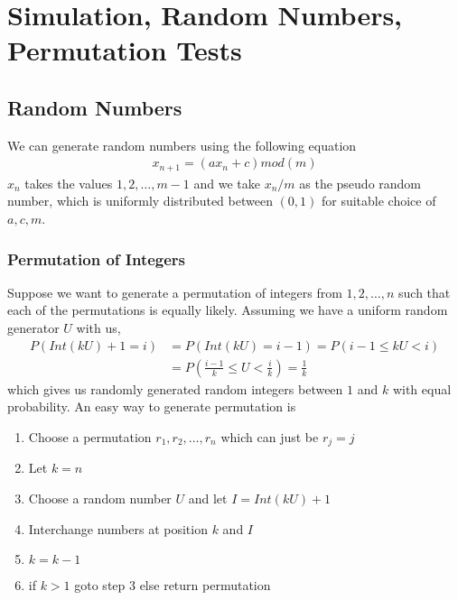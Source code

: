 \documentclass[../probability-notes.tex]{subfiles}
\begin{document}
    \section{Simulation, Random Numbers, Permutation Tests}
    \subsection{Random Numbers}
    We can generate random numbers using the following equation
    \begin{align*}
        x_{n+1} = (ax_{n} + c) mod(m)
    \end{align*}
    $x_{n}$ takes the values $1,2,\ldots, m-1$ and we take $x_{n}/m$ as the pseudo random number, which is uniformly distributed between $(0,1)$ for suitable choice of $a, c, m$.\newline

    
    \subsubsection{Permutation of Integers}
    Suppose we want to generate a permutation of integers from $1, 2, \ldots, n$ such that each of the permutations is equally likely. Assuming we have a uniform random generator $U$ with us, 
    \begin{align*}
        P(Int(kU) + 1 = i) &= P(Int(kU) = i-1) = P(i-1 \leq kU < i)\\
        &= P(\frac{i-1}{k} \leq U < \frac{i}{k}) = \frac{1}{k}
    \end{align*}
    which gives us randomly generated random integers between $1$ and $k$ with equal probability. An easy way to generate permutation is
    \begin{enumerate}
        \item Choose a permutation $r_{1}, r_{2}, \ldots, r_{n}$ which can just be $r_{j} = j$
        \item Let $k = n$
        \item Choose a random number $U$ and let $I = Int(kU) + 1$
        \item Interchange numbers at position $k$ and $I$
        \item $k = k-1$
        \item if $k > 1$ goto step 3 else return permutation
    \end{enumerate}
\end{document}
